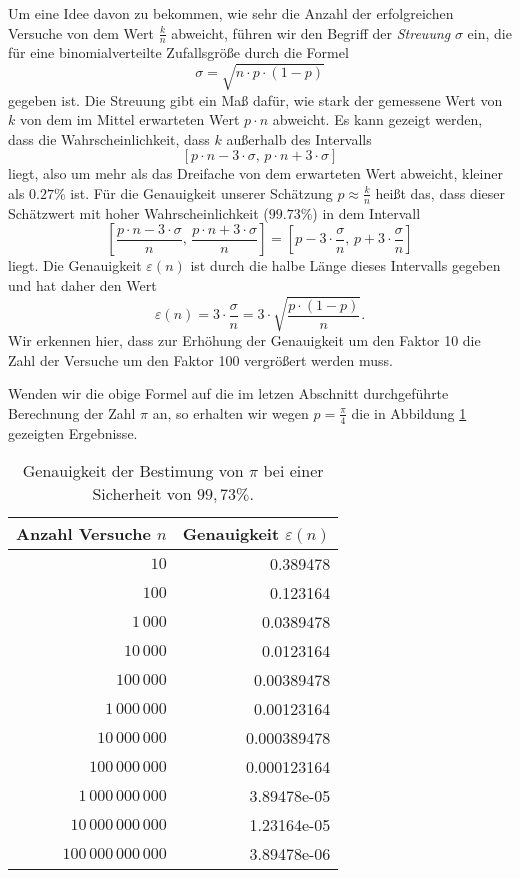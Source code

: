 Um eine Idee davon zu bekommen, wie sehr die Anzahl der erfolgreichen Versuche von dem Wert $\frac{k}{n}$
abweicht,  f\"uhren wir den Begriff der \emph{Streuung} $\sigma$ ein, die f\"ur eine binomialverteilte Zufallsgr\"o\ss{}e
durch die Formel
\[ \sigma = \sqrt{n \cdot p \cdot (1 - p)} \]
gegeben ist.  Die Streuung gibt ein Ma\ss{} daf\"ur, wie stark der gemessene Wert von $k$ von dem im Mittel
erwarteten Wert $p \cdot n$ abweicht.  Es kann gezeigt werden, dass die Wahrscheinlichkeit, dass $k$ au\ss{}erhalb
des Intervalls
\[ [ p \cdot n - 3 \cdot \sigma,\, p \cdot n + 3 \cdot \sigma ] \]
liegt, also um mehr als das Dreifache von dem erwarteten Wert abweicht, kleiner als $0.27 \%$ ist.  F\"ur
 die Genauigkeit unserer Sch\"atzung $p \approx \frac{k}{n}$ hei\ss{}t das, dass dieser Sch\"atzwert mit hoher
 Wahrscheinlichkeit ($99.73\%$) in dem Intervall
\[  \left[ \frac{p \cdot n - 3 \cdot \sigma}{n},\, \frac{p \cdot n + 3 \cdot \sigma}{n} \right] 
  = \left[ p - 3 \cdot \frac{\sigma}{n},\, p + 3 \cdot \frac{\sigma}{n} \right]
\] 
liegt.  Die Genauigkeit $\varepsilon(n)$ ist durch die halbe L\"ange dieses Intervalls gegeben und hat daher den
Wert 
\[ \varepsilon(n) = 3 \cdot \frac{\sigma}{n} = 3 \cdot \sqrt{\frac{p \cdot (1 - p)}{n}}. \]
Wir erkennen hier, dass zur Erh\"ohung der Genauigkeit um den Faktor 10 die Zahl der Versuche um den Faktor 100
vergr\"o\ss{}ert werden muss.

Wenden wir die obige Formel auf die im letzen Abschnitt durchgef\"uhrte Berechnung der Zahl $\pi$ an, so erhalten
wir wegen $p = \frac{\pi}{4}$ die in Abbildung \ref{tab:Precision.java} gezeigten Ergebnisse.

\begin{table}[htbp]
  \centering
  \begin{tabular}[t]{|r|r|}
\hline
Anzahl Versuche $n$ & Genauigkeit $\varepsilon(n)$ \\
\hline
\hline
                $10$ & 0.389478 \\
\hline
               $100$ & 0.123164 \\
\hline
            $1\,000$ & 0.0389478 \\
\hline
           $10\,000$ & 0.0123164 \\
\hline
          $100\,000$ & 0.00389478 \\
\hline
       $1\,000\,000$ & 0.00123164 \\
\hline
      $10\,000\,000$ & 0.000389478 \\
\hline
     $100\,000\,000$ & 0.000123164 \\
\hline
  $1\,000\,000\,000$ & 3.89478e-05 \\
\hline
 $10\,000\,000\,000$ & 1.23164e-05 \\
\hline
$100\,000\,000\,000$ & 3.89478e-06 \\
\hline

  \end{tabular}
  \caption{Genauigkeit der Bestimung von $\pi$ bei einer Sicherheit von $99,73\%$.}
  \label{tab:Precision.java}
\end{table}

